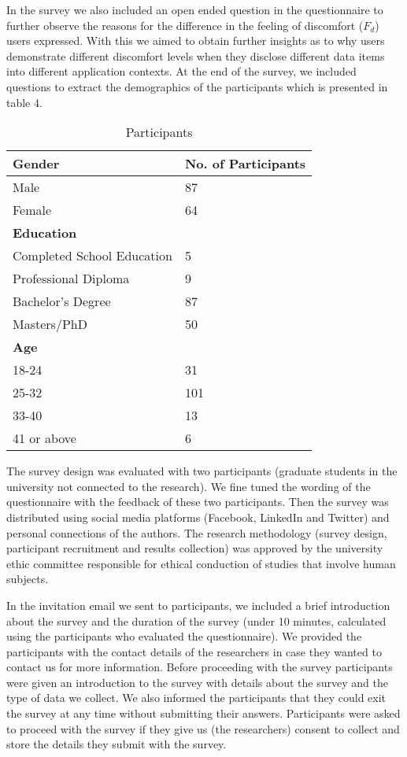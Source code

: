 \documentclass[10pt]{article}
\begin{document}
In the survey we also included an open ended question in the questionnaire to further observe the reasons for the difference in the feeling of discomfort ($F_d$) users expressed. With this we aimed to obtain further insights as to why users demonstrate different discomfort levels when they disclose different data items into different application contexts. At the end of the survey, we included questions to extract the demographics of the participants which is presented in table 4.

\begin{center}
\begin{table}[htbp]
\caption{Participants}
\begin{center}
\begin{tabular}{|l|l|} 
\hline
\textbf{Gender} & \textbf{No. of Participants} \\
\hline
Male & 87 \\
\hline
Female & 64 \\
\hline
\multicolumn{2}{l}{\textbf{Education}} \\
\hline
Completed School Education & 5 \\
\hline
Professional Diploma & 9 \\
\hline
Bachelor's Degree & 87 \\
\hline
Masters/PhD & 50 \\
\hline
\multicolumn{2}{l}{\textbf{Age}} \\
\hline
18-24  & 31 \\
\hline
25-32 & 101 \\
\hline
33-40& 13 \\
\hline
41 or above & 6\\
\hline
\end{tabular}
\end{center}
\end{table}
\end{center} 

The survey design was evaluated with two participants (graduate students in the university not connected to the research). We fine tuned the wording of the questionnaire with the feedback of these two participants. Then the survey was distributed using social media platforms (Facebook, LinkedIn and Twitter) and personal connections of the authors. The research methodology (survey design, participant recruitment and results collection) was approved by the university ethic committee responsible for ethical conduction of studies that involve human subjects. 

In the invitation email we sent to participants, we included a brief introduction about the survey and the duration of the survey (under 10 minutes, calculated using the participants who evaluated the questionnaire). We provided the participants with the contact details of the researchers in case they wanted to contact us for more information. Before proceeding with the survey participants were given an introduction to the survey with details about the survey and the type of data we collect. We also informed the participants that they could exit the survey at any time without submitting their answers. Participants were asked to proceed with the survey if they give us (the researchers) consent to collect and store the details they submit with the survey.
\end{document}
